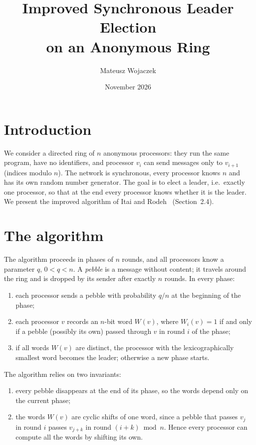 \documentclass[11pt,a4paper]{article}
\title{Improved Synchronous Leader Election\\on an Anonymous Ring}
\author{Mateusz Wojaczek}
\date{November 2026}
\begin{document}
\maketitle

\section{Introduction}

We consider a directed ring of $n$ anonymous processors: they run the same program, have no
identifiers, and processor $v_i$ can send messages only to $v_{i+1}$ (indices modulo $n$). The
network is synchronous, every processor knows $n$ and has its own random number generator. The
goal is to elect a leader, i.e.\ exactly one processor, so that at the end every processor knows
whether it is the leader. We present the improved algorithm of Itai and Rodeh~\cite{ir}
(Section~2.4).

\section{The algorithm}

The algorithm proceeds in phases of $n$ rounds, and all processors know a parameter $q$, $0<q<n$.
A \emph{pebble} is a message without content; it travels around the ring and is dropped by its
sender after exactly $n$ rounds. In every phase:
\begin{enumerate}
  \item each processor sends a pebble with probability $q/n$ at the beginning of the phase;
  \item each processor $v$ records an $n$-bit word $W(v)$, where $W_i(v)=1$ if and only if
        a pebble (possibly its own) passed through $v$ in round $i$ of the phase;
  \item if all words $W(v)$ are distinct, the processor with the lexicographically smallest word
        becomes the leader; otherwise a new phase starts.
\end{enumerate}

\noindent The algorithm relies on two invariants:
\begin{enumerate}
  \item every pebble disappears at the end of its phase, so the words depend only on the
        current phase;
  \item the words $W(v)$ are cyclic shifts of one word, since a pebble that passes $v_j$ in round
        $i$ passes $v_{j+k}$ in round $(i+k) \bmod n$. Hence every processor can compute all the
        words by shifting its own.
\end{enumerate}
\end{document}
